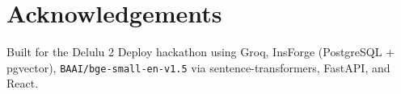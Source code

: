 \documentclass[11pt,a4paper]{article}
\begin{document}
\section*{Acknowledgements}

Built for the Delulu 2 Deploy hackathon using Groq, InsForge (PostgreSQL +
pgvector), \texttt{BAAI/bge-small-en-v1.5} via sentence-transformers,
FastAPI, and React.
\end{document}
